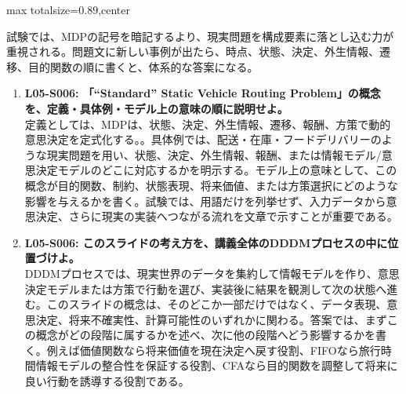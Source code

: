 \begin{minipage}[t]{0.58\textwidth}
\begin{adjustbox}{max totalsize={\textwidth}{0.89\textheight},center}
\begin{minipage}{\textwidth}
試験では、MDPの記号を暗記するより、現実問題を構成要素に落とし込む力が重視される。問題文に新しい事例が出たら、時点、状態、決定、外生情報、遷移、目的関数の順に書くと、体系的な答案になる。\par{}\begin{enumerate}\item \textbf{L05-S006: 「“Standard” Static Vehicle Routing Problem」の概念を、定義・具体例・モデル上の意味の順に説明せよ。}\\定義としては、MDPは、状態、決定、外生情報、遷移、報酬、方策で動的意思決定を定式化する。。具体例では、配送・在庫・フードデリバリーのような現実問題を用い、状態、決定、外生情報、報酬、または情報モデル/意思決定モデルのどこに対応するかを明示する。モデル上の意味として、この概念が目的関数、制約、状態表現、将来価値、または方策選択にどのような影響を与えるかを書く。試験では、用語だけを列挙せず、入力データから意思決定、さらに現実の実装へつながる流れを文章で示すことが重要である。\item \textbf{L05-S006: このスライドの考え方を、講義全体のDDDMプロセスの中に位置づけよ。}\\DDDMプロセスでは、現実世界のデータを集約して情報モデルを作り、意思決定モデルまたは方策で行動を選び、実装後に結果を観測して次の状態へ進む。このスライドの概念は、そのどこか一部だけではなく、データ表現、意思決定、将来不確実性、計算可能性のいずれかに関わる。答案では、まずこの概念がどの段階に属するかを述べ、次に他の段階へどう影響するかを書く。例えば価値関数なら将来価値を現在決定へ戻す役割、FIFOなら旅行時間情報モデルの整合性を保証する役割、CFAなら目的関数を調整して将来に良い行動を誘導する役割である。\end{enumerate}
\end{minipage}
\end{adjustbox}
\end{minipage}


